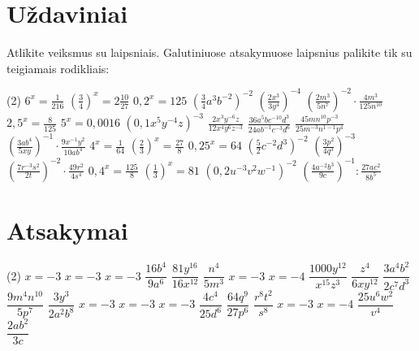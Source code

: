 \documentclass[11pt,a4paper]{scrartcl}
\begin{document}
\section{Uždaviniai}
\begin{problem}
Atlikite veiksmus su laipsniais. Galutiniuose atsakymuose laipsnius palikite tik su teigiamais rodikliais:

\begin{tasks}[label={(\arabic*)}, label-offset=0.9em](2)
    \task $6^x=\frac{1}{216}$
    \task $\left(\frac{3}{4}\right)^x=2\frac{10}{27}$
    \task $0,2^x=125$
    \task $\left(\frac{3}{4}a^3b^{-2}\right)^{-2}$
    \task $\left(\frac{2x^3}{3y^4}\right)^{-4}$
    \task $\left(\frac{2m^3}{5n^7}\right)^{-2}\cdot\frac{4m^3}{125n^{10}}$
    \task $2,5^x=\frac{8}{125}$
    \task $5^x=0,0016$
    \task $\left(0,1x^5y^{-4}z\right)^{-3}$
    \task $\frac{2x^3y^{-6}z}{12x^4y^6z^{-3}}$
    \task $\frac{36a^5bc^{-10}d^3}{24ab^{-1}c^{-3}d^6}$
    \task $\frac{45mn^{10}p^{-3}}{25m^{-3}n^{1-1}p^4}$
    \task $\left(\frac{3ab^4}{5xy}\right)^{-1}\cdot\frac{9x^{-1}y^2}{10ab^4}$
    \task $4^x=\frac{1}{64}$
    \task $\left(\frac{2}{3}\right)^x=\frac{27}{8}$
    \task $0,25^x=64$
    \task $\left(\frac{5}{2}c^{-2}d^3\right)^{-2}$
    \task $\left(\frac{3p^2}{4q^3}\right)^{-3}$
    \task $\left(\frac{7r^{-3}s^2}{2t}\right)^{-2}\cdot\frac{49r^2}{4s^4}$
    \task $0,4^x=\frac{125}{8}$
    \task $\left(\frac{1}{3}\right)^x=81$
    \task $\left(0,2u^{-3}v^2w^{-1}\right)^{-2}$
    \task $\left(\frac{4a^{-2}b^3}{9c}\right)^{-1} : \frac{27ac^2}{8b^5}$
\end{tasks}
\end{problem}

\newpage
\section{Atsakymai}
\begin{tasks}[label={(\arabic*)}, label-offset=0.9em](2)
    \task $x=-3$
    \task $x=-3$
    \task $x=-3$
    \task $\dfrac{16b^4}{9a^6}$
    \task $\dfrac{81y^{16}}{16x^{12}}$
    \task $\dfrac{n^4}{5m^3}$
    \task $x=-3$
    \task $x=-4$
    \task $\dfrac{1000y^{12}}{x^{15}z^3}$
    \task $\dfrac{z^4}{6xy^{12}}$
    \task $\dfrac{3a^4b^2}{2c^7d^3}$
    \task $\dfrac{9m^4n^{10}}{5p^7}$
    \task $\dfrac{3y^3}{2a^2b^8}$
    \task $x=-3$
    \task $x=-3$
    \task $x=-3$
    \task $\dfrac{4c^4}{25d^6}$
    \task $\dfrac{64q^9}{27p^6}$
    \task $\dfrac{r^8t^2}{s^8}$
    \task $x=-3$
    \task $x=-4$
    \task $\dfrac{25u^6w^2}{v^4}$
    \task $\dfrac{2ab^2}{3c}$
\end{tasks}
\end{document}

